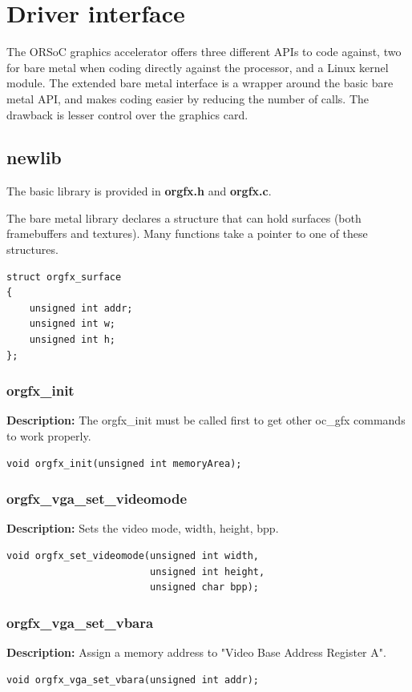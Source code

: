 \documentclass[10pt,a4paper]{article}
\begin{document}
\section{Driver interface}
The ORSoC graphics accelerator offers three different APIs to code against, two for bare metal when coding directly against the processor, and a Linux kernel module. The extended bare metal interface is a wrapper around the basic bare metal API, and makes coding easier by reducing the number of calls. The drawback is lesser control over the graphics card.

\subsection{newlib}
The basic library is provided in \textbf{orgfx.h} and \textbf{orgfx.c}.

The bare metal library declares a structure that can hold surfaces (both framebuffers and textures). Many functions take a pointer to one of these structures.
\begin{lstlisting}
struct orgfx_surface
{
	unsigned int addr;
	unsigned int w;
	unsigned int h;
};
\end{lstlisting}

\subsubsection{orgfx\_init}
\textbf{Description:} The orgfx\_init must be called first to get other oc\_gfx commands to work properly.
\begin{lstlisting}
void orgfx_init(unsigned int memoryArea);
\end{lstlisting}

\subsubsection{orgfx\_vga\_set\_videomode}
\textbf{Description:} Sets the video mode, width, height, bpp.
\begin{lstlisting}
void orgfx_set_videomode(unsigned int width, 
                         unsigned int height, 
                         unsigned char bpp);
\end{lstlisting}

\subsubsection{orgfx\_vga\_set\_vbara}
\textbf{Description:} Assign a memory address to "Video Base Address Register A".
\begin{lstlisting}
void orgfx_vga_set_vbara(unsigned int addr);
\end{lstlisting}
\end{document}
